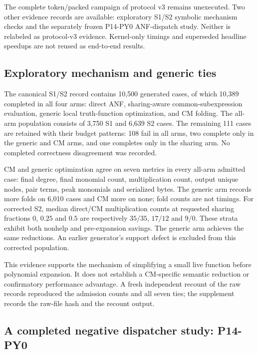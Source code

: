\documentclass[11pt]{article}
\begin{document}
The complete token/packed campaign of protocol v3 remains unexecuted. Two
other evidence records are available: exploratory S1/S2 symbolic mechanism
checks and the separately frozen P14-PY0 ANF-dispatch study. Neither is
relabeled as protocol-v3 evidence. Kernel-only timings and superseded headline
speedups are not reused as end-to-end results.

\subsection{Exploratory mechanism and generic ties}
\label{sec:mechanism-evidence}

The canonical S1/S2 record contains 10,500 generated cases, of which 10,389
completed in all four arms: direct ANF, sharing-aware common-subexpression
evaluation, generic local truth-function optimization, and CM folding. The
all-arm population consists of 3,750 S1 and 6,639 S2 cases. The remaining 111
cases are retained with their budget patterns: 108 fail in all arms, two
complete only in the generic and CM arms, and one completes only in the
sharing arm. No completed correctness disagreement was recorded.

CM and generic optimization agree on seven metrics in every all-arm admitted
case: final degree, final monomial count, multiplication count, output unique
nodes, pair terms, peak monomials and serialized bytes. The generic arm records
more folds on 6,010 cases and CM more on none; fold counts are not timings.
For corrected S2, median direct/CM multiplication counts at requested sharing
fractions $0$, $0.25$ and $0.5$ are respectively $35/35$, $17/12$ and $9/0$.
These strata exhibit both nonhelp and pre-expansion savings. The generic arm
achieves the same reductions. An earlier generator's support defect is
excluded from this corrected population.

This evidence supports the mechanism of simplifying a small live function
before polynomial expansion. It does not establish a CM-specific semantic
reduction or confirmatory performance advantage. A fresh independent recount
of the raw records reproduced the admission counts and all seven ties; the
supplement records the raw-file hash and the recount output.

\subsection{A completed negative dispatcher study: P14-PY0}
\label{sec:p14}
\end{document}
